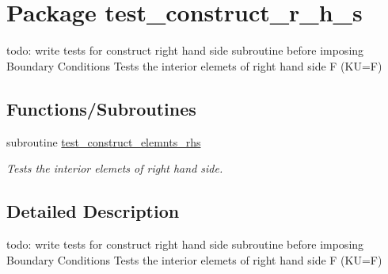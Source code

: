 \hypertarget{a00078}{
\section{Package test\_\-construct\_\-r\_\-h\_\-s}
\label{a00078}
}
todo: write tests for construct right hand side subroutine before imposing Boundary Conditions Tests the interior elemets of right hand side F (KU=F)  


\subsection*{Functions/Subroutines}
\begin{CompactItemize}
\item 
\hypertarget{a00078_48aa42f729e645de7bf79763e2ae397e}{
subroutine \hyperlink{a00078_48aa42f729e645de7bf79763e2ae397e}{test\_\-construct\_\-elemnts\_\-rhs}}
\label{a00078_48aa42f729e645de7bf79763e2ae397e}

\begin{CompactList}\small\item\em Tests the interior elemets of right hand side. \item\end{CompactList}\end{CompactItemize}


\subsection{Detailed Description}
todo: write tests for construct right hand side subroutine before imposing Boundary Conditions Tests the interior elemets of right hand side F (KU=F) 

